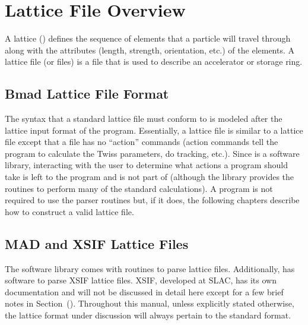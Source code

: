 \chapter{Lattice File Overview}
\label{c:lat.file}

A lattice () defines the sequence of elements
that a particle will travel through along with the attributes (length,
strength, orientation, etc.) of the elements.  A lattice file (or
files) is a file that is used to describe an accelerator or storage
ring. 

\section{Bmad Lattice File Format}
\label{s:lattice.file.formats}

The syntax that a \bmad standard lattice file must conform to is
modeled after the lattice input format of the \mad program.
Essentially, a \bmad lattice file is similar to a \mad lattice file
except that a \bmad file has no ``action'' commands (action commands
tell the program to calculate the Twiss parameters, do tracking,
etc.).  Since \bmad is a software library, interacting with the user to 
determine what actions a program
should take is left to the program and is not part of \bmad (although
the \bmad library provides the routines to perform many of the standard
calculations). A program is not required to use the \bmad parser
routines but, if it does, the following chapters describe how to
construct a valid lattice file.

\section{MAD and XSIF Lattice Files}
\label{s:mad.xsif}

The \bmad software library comes with routines to parse \bmad lattice
files. Additionally, \bmad has software to parse XSIF\cite{b:xsif}
lattice files. XSIF, developed at SLAC, has its own documentation and
will not be discussed in detail here except for a few brief notes in
Section~().  Throughout this manual, unless explicitly
stated otherwise, the lattice format under discussion will always
pertain to the \bmad standard format.

